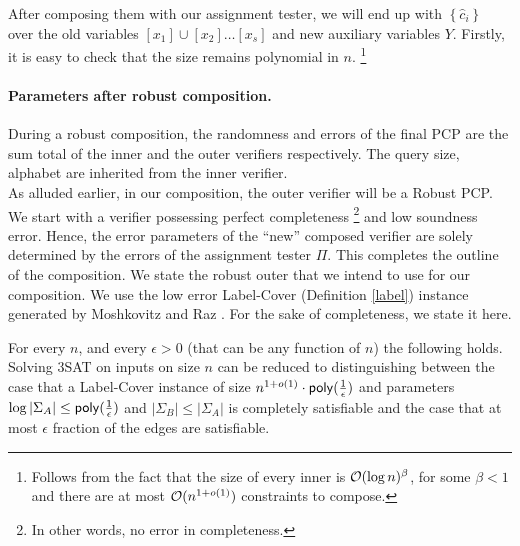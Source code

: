 \begin{itemize}
  After composing them with our assignment tester, we will end up with
  $\left\{\widehat{c}_i\right\}$ over the old variables $[x_1] \cup
  [x_2] \ldots [x_s]$ and new auxiliary variables $Y$.  Firstly, it is
  easy to check that the size remains polynomial in $n$.
  \footnote{Follows from the fact that the size of every inner is
    ${\cal O}(\log n)^\beta$, for some $\beta < 1$ and there are at
    most ${\cal O}(n^{1 + o(1)})$ constraints to compose.}
\end{itemize}

\paragraph{Parameters after robust composition.} During a robust composition,
	the randomness and errors of the final PCP are the sum total of the inner and the outer
	verifiers respectively. The query size, alphabet are inherited from the inner verifier. \\


As alluded earlier, in our composition, the outer verifier will be a Robust PCP. We start with a
verifier possessing perfect completeness \footnote{In other words, no
  error in completeness.}  and low soundness error. Hence, the error
parameters of the ``new'' composed verifier are solely determined by
the errors of the assignment tester $\Pi$. This completes the outline
of the composition.  We state the robust outer that we intend to use
for our composition. We use the low error {\sc Label-Cover}
(Definition \ref{label}) instance generated by Moshkovitz and Raz
\cite{MR08}. For the sake of completeness, we state it here.

\begin{theorem}\label{lowlc}
  For every $n$, and every $\epsilon > 0$ (that can be any function of
  $n$) the following holds. Solving {\sc 3SAT} on inputs on size $n$
  can be reduced to distinguishing between the case that a {\sc
    Label-Cover} instance of size $n^{1 + o(1)} \cdot {\sf
    poly}(\frac{1}{\epsilon})$ and parameters $\log
  |\Sigma_A| \le {\sf poly(\frac{1}{\epsilon})}$ and
  $|\Sigma_B| \le |\Sigma_A|$ is completely satisfiable and the case
  that at most $\epsilon$ fraction of the edges are satisfiable.
\end{theorem}

